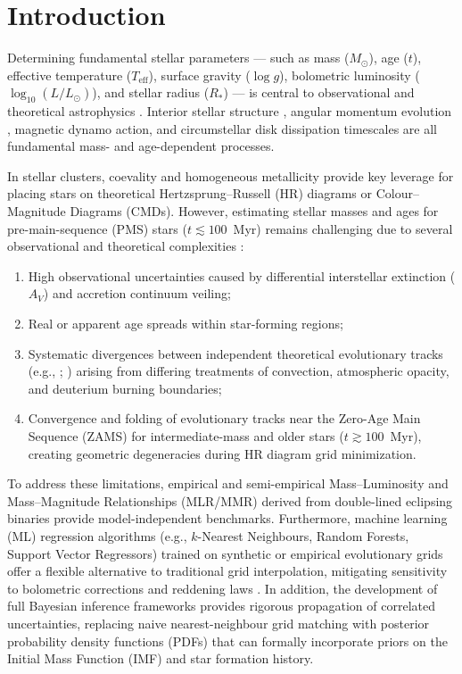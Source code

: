 \documentclass[preprints,article,submit,moreauthors,pdftex]{Definitions/mdpi}
\begin{document}
\section{Introduction}
\label{sec:intro}

Determining fundamental stellar parameters --- such as mass ($M_\odot$), age ($t$), effective temperature ($T_{\text{eff}}$), surface gravity ($\log g$), bolometric luminosity ($\log_{10}(L/L_\odot)$), and stellar radius ($R_*$) --- is central to observational and theoretical astrophysics \citep{serenelli2021weighing}. Interior stellar structure \citep{baraffe2015new}, angular momentum evolution \citep{bell2014pre}, magnetic dynamo action, and circumstellar disk dissipation timescales are all fundamental mass- and age-dependent processes.

In stellar clusters, coevality and homogeneous metallicity provide key leverage for placing stars on theoretical Hertzsprung--Russell (HR) diagrams or Colour--Magnitude Diagrams (CMDs). However, estimating stellar masses and ages for pre-main-sequence (PMS) stars ($t \lesssim 100$~Myr) remains challenging due to several observational and theoretical complexities \citep{herczeg2015empirical}:
\begin{enumerate}
    \item High observational uncertainties caused by differential interstellar extinction ($A_V$) and accretion continuum veiling;
    \item Real or apparent age spreads within star-forming regions;
    \item Systematic divergences between independent theoretical evolutionary tracks (e.g., \citealt{siess2000internet}; \citealt{baraffe2015new}) arising from differing treatments of convection, atmospheric opacity, and deuterium burning boundaries;
    \item Convergence and folding of evolutionary tracks near the Zero-Age Main Sequence (ZAMS) for intermediate-mass and older stars ($t \gtrsim 100$~Myr), creating geometric degeneracies during HR diagram grid minimization.
\end{enumerate}

To address these limitations, empirical and semi-empirical Mass--Luminosity and Mass--Magnitude Relationships (MLR/MMR) derived from double-lined eclipsing binaries \citep{delfosse2000accurate, benedict2016solar} provide model-independent benchmarks. Furthermore, machine learning (ML) regression algorithms (e.g., $k$-Nearest Neighbours, Random Forests, Support Vector Regressors) trained on synthetic or empirical evolutionary grids offer a flexible alternative to traditional grid interpolation, mitigating sensitivity to bolometric corrections and reddening laws \citep{lodieu2019fiveD}. In addition, the development of full Bayesian inference frameworks \citep{serenelli2021weighing} provides rigorous propagation of correlated uncertainties, replacing naive nearest-neighbour grid matching with posterior probability density functions (PDFs) that can formally incorporate priors on the Initial Mass Function (IMF) and star formation history.
\end{document}
